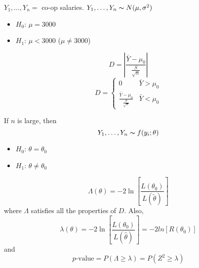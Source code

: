 \begin{exbox}
    \begin{example}
        $ Y_1,\ldots ,Y_n = $ co-op salaries. $ Y_1,\ldots ,Y_n \thicksim N(\mu,\sigma^2) $
        \begin{itemize}
            \item $ H_0 $: $ \mu=3000 $
            \item $ H_1 $: $ \mu<3000 $ ($ \mu\neq 3000 $)
        \end{itemize}
        \[ D=\left|\frac{\bar{Y}-\mu_0}{\frac{S}{\sqrt{n}}} \right| \]
        \[ D=
            \begin{cases}
                0                                        & \bar{Y}>\mu_0 \\
                \frac{\bar{Y}-\mu_0}{\frac{S}{\sqrt{n}}} & \bar{Y}<\mu_0
            \end{cases} \]
    \end{example}
\end{exbox}
If $ n $ is large, then
\[ Y_1,\ldots ,Y_n \thicksim f(y_i;\theta) \]
\begin{itemize}
    \item $ H_0 $: $ \theta=\theta_0 $
    \item $ H_1 $: $ \theta\neq \theta_0 $
\end{itemize}
\[ \Lambda(\theta)=-2\ln\left[ \frac{L(\theta_0)}{L(\tilde{\theta})} \right] \]
where $ \Lambda $ satisfies all the properties of $ D $. Also,
\[ \lambda(\theta)=-2\ln\left[ \frac{L(\theta_0)}{L(\hat{\theta})}\right] =-2ln\left[ R(\theta_0) \right] \]
and
\[ p\text{-value}=P(\Lambda\geqslant \lambda)=P(Z^2\geqslant \lambda) \]
